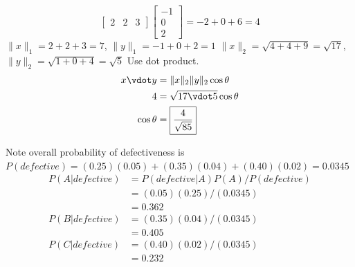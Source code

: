 \documentclass[newpage]{homework}
\begin{document}
\maketitle


\question
\begin{alphaparts}
    \questionpart \[\begin{bmatrix}2&2&3\end{bmatrix} \begin{bmatrix}-1\\0\\2\end{bmatrix}	= -2 + 0 + 6 = \boxed{4}\]
    \questionpart $\lVert x \rVert_1	=	2 + 2 + 3 = \boxed{7}$, $\lVert y \rVert_1	=	-1 + 0 + 2 = \boxed{1}$
    \questionpart $\lVert x \rVert_2	=	\sqrt{4+4+9} = \boxed{\sqrt{17}}$, $\lVert y \rVert_2	=	\sqrt{1+0+4} = \boxed{\sqrt{5}}$
    \questionpart Use dot product.
    \begin{align*}
        x \vdot y &= \lVert x \rVert_2 \lVert y \rVert_2 \cos{\theta} \\
        4 &=    \sqrt{17 \vdot 5} \cos{\theta}  \\ 
        \cos{\theta}    &=  \boxed{\frac{4}{\sqrt{85}}}    \\
    \end{align*}
\end{alphaparts}


\question
Note overall probability of defectiveness is $P(defective) = (0.25)(0.05) + (0.35)(0.04) + (0.40)(0.02) = 0.0345$
\begin{align*}
    P(A|defective)	&=	P(defective|A)P(A) / P(defective)	\\
                    &=	(0.05)(0.25) / (0.0345)	\\
                    &=  \boxed{0.362}  \\
    P(B|defective)	&=  (0.35)(0.04)  / (0.0345)	\\
                    &=  \boxed{0.405}  \\
    P(C|defective)	&=	(0.40)(0.02) / (0.0345)	\\
                    &=  \boxed{0.232}  \\
\end{align*}
\end{document}
